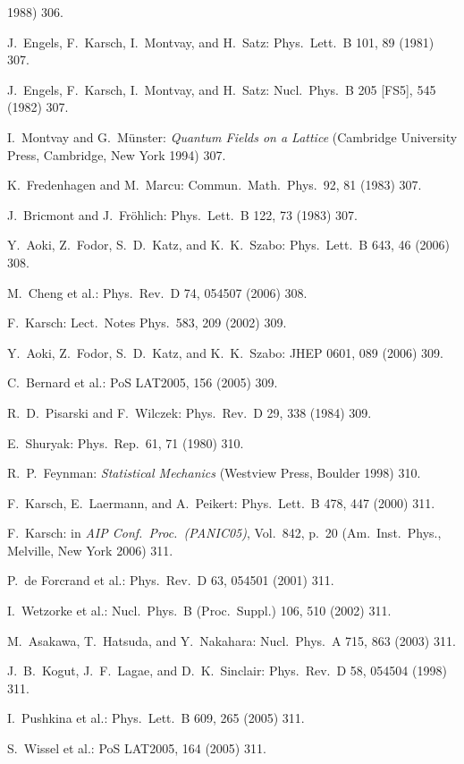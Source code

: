 \begin{enumerate}[label={[\arabic*]}]
        1988) 306.
  \item J.~Engels, F.~Karsch, I.~Montvay, and H.~Satz: Phys.\ Lett.\ B 101, 89
        (1981) 307.
  \item J.~Engels, F.~Karsch, I.~Montvay, and H.~Satz: Nucl.\ Phys.\ B 205
        [FS5], 545 (1982) 307.
  \item I.~Montvay and G.~M\"unster: \emph{Quantum Fields on a Lattice}
        (Cambridge University Press, Cambridge, New York 1994) 307.
  \item K.~Fredenhagen and M.~Marcu: Commun.\ Math.\ Phys.\ 92, 81 (1983) 307.
  \item J.~Bricmont and J.~Fr\"ohlich: Phys.\ Lett.\ B 122, 73 (1983) 307.
  \item Y.~Aoki, Z.~Fodor, S.~D.~Katz, and K.~K.~Szabo: Phys.\ Lett.\ B 643, 46
        (2006) 308.
  \item M.~Cheng et al.: Phys.\ Rev.\ D 74, 054507 (2006) 308.
  \item F.~Karsch: Lect.\ Notes Phys.\ 583, 209 (2002) 309.
  \item Y.~Aoki, Z.~Fodor, S.~D.~Katz, and K.~K.~Szabo: JHEP 0601, 089 (2006)
        309.
  \item C.~Bernard et al.: PoS LAT2005, 156 (2005) 309.
  \item R.~D.~Pisarski and F.~Wilczek: Phys.\ Rev.\ D 29, 338 (1984) 309.
  \item E.~Shuryak: Phys.\ Rep.\ 61, 71 (1980) 310.
  \item R.~P.~Feynman: \emph{Statistical Mechanics} (Westview Press, Boulder
        1998) 310.
  \item F.~Karsch, E.~Laermann, and A.~Peikert: Phys.\ Lett.\ B 478, 447 (2000)
        311.
  \item F.~Karsch: in \emph{AIP Conf.\ Proc.\ (PANIC05)}, Vol.~842, p.~20
        (Am.\ Inst.\ Phys., Melville, New York 2006) 311.
  \item P.~de Forcrand et al.: Phys.\ Rev.\ D 63, 054501 (2001) 311.
  \item I.~Wetzorke et al.: Nucl.\ Phys.\ B (Proc.\ Suppl.) 106, 510 (2002)
        311.
  \item M.~Asakawa, T.~Hatsuda, and Y.~Nakahara: Nucl.\ Phys.\ A 715, 863
        (2003) 311.
  \item J.~B.~Kogut, J.~F.~Lagae, and D.~K.~Sinclair: Phys.\ Rev.\ D 58,
        054504 (1998) 311.
  \item I.~Pushkina et al.: Phys.\ Lett.\ B 609, 265 (2005) 311.
  \item S.~Wissel et al.: PoS LAT2005, 164 (2005) 311.

\end{enumerate}
